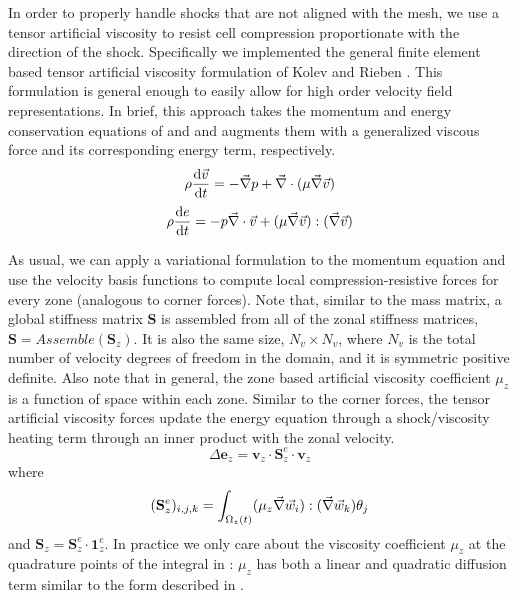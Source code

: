 In order to properly handle shocks that are not aligned with the mesh, we use a tensor artificial viscosity to resist cell compression proportionate with the direction of the shock. Specifically we implemented the general finite element based tensor artificial viscosity formulation of Kolev and Rieben \cite{KolevRieben09}. This formulation is general enough to easily allow for high order velocity field representations. In brief, this approach takes the momentum and energy conservation equations of  and
 and augments them with a generalized viscous force and its corresponding energy term, respectively. 
$$
    \rho \frac{\mathrm{d} \vec v}{\mathrm{d} t} = - \vec \nabla p       + \vec \nabla \cdot( \mu \vec \nabla \vec v)
$$
$$
    \rho \frac{\mathrm{d} e}{\mathrm{d} t}      = - p \vec \nabla \cdot \vec v + (\mu \vec \nabla \vec v):(\vec \nabla \vec v)
$$

As usual, we can apply a variational formulation to the momentum equation and use the velocity basis functions to compute local compression-resistive forces for every zone (analogous to corner forces).
Note that, similar to the mass matrix, a global stiffness matrix $\mathbf{S}$ is assembled from all of the zonal stiffness matrices, $\mathbf{S} = Assemble(\mathbf{S}_z)$. It is also the same size, $N_v \times N_v$, where $N_v$ is the total number of velocity degrees of freedom in the domain, and it is symmetric positive definite. Also note that in general, the zone based artificial viscosity coefficient $\mu_z$ is a function of space within each zone. Similar to the corner forces, the tensor artificial viscosity forces update the energy equation through a shock/viscosity heating term through an inner product with the zonal velocity.
$$
  \Delta \mathbf{e}_z = \mathbf{v}_z \cdot \mathbf{S}^e_z \cdot \mathbf{v}_z
$$
where 
$$
  (\mathbf{S}^e_z)_{i,j,k} = \int_{{\Omega}_z(t)}
  (\mu_z \vec \nabla \vec w_i) : (\vec \nabla \vec w_k) \theta_j
$$
and $\mathbf{S}_z = \mathbf{S}_z^e \cdot \mathbf{1}_z^e$. In practice we only care about the viscosity coefficient $\mu_z$ at the quadrature points of the integral in : $\mu_z$ has both a linear and quadratic diffusion term similar to the form described in  \cite{KolevRieben09}.


